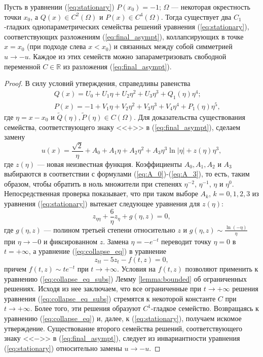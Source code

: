 \begin{proposition}
Пусть в уравнении (\ref{eq:stationary}) $P(x_0) = -1$; $\Omega$ --- некоторая окрестность точки $x_0$, а $Q(x) \in C^2(\Omega)$ и $P(x) \in C^4(\Omega)$.
Тогда существует два $C_1$-гладких однопараметрических семейства решений уравнения (\ref{eq:stationary}), соответствующих разложениям (\ref{eq:final_asympt}), коллапсирующих в точке $x = x_0$ (при подходе слева $x < x_0$) и связанных между собой симметрией $u \to -u$.
Каждое из этих семейств можно запараметризовать свободной переменной $C \in \mathbb{R}$ из разложения (\ref{eq:final_asympt}).
\label{prop:asymptotic}
\end{proposition}
%
\begin{proof}
В силу условий утверждения, справедливы равенства
%
\begin{eqnarray}
&& Q(x) = U_0 + U_1 \eta + U_2 \eta^2 + U_3 \eta^3 + Q_1(\eta)\eta^4; \\
&& P(x) = -1 + V_1 \eta+ V_2 \eta^2 + V_3 \eta^3 + V_4 \eta^4 + P_1(\eta)\eta^5,
\end{eqnarray}
%
где $\eta = x - x_0$ и $\widetilde{Q}(\eta), \widetilde{P}(\eta) \in C(\Omega)$.
Для доказательства существования семейства, соответствующего знаку <<$+$>> в (\ref{eq:final_asympt}), сделаем замену
%
\begin{equation}
u(x) = \frac{\sqrt{2}}\eta + A_0 + A_1 \eta + A_2 \eta^2 + A_3 \eta^3 \ln|\eta| + z(\eta)\eta^3,
\end{equation}
%
где $z(\eta)$ --- новая неизвестная функция.
Коэффициенты $A_0, A_1, A_2$ и $A_3$ выбираются в соответствии с формулами (\ref{eq:A_0})-(\ref{eq:A_3}), то есть, таким образом, чтобы обратить в ноль множители при степенях $\eta^{-2}$, $\eta^{-1}$, $\eta$ и $\eta^0$.
Непосредственная проверка показывает, что при таком выборе $A_k$, $k = 0,1,2,3$ из уравнения (\ref{eq:stationary}) вытекает следующее уравнения для $z(\eta)$:
%
\begin{equation}
z_{\eta\eta} + \frac{6}{\eta} z_\eta + g(\eta, z) = 0,
\label{eq:collapse_eq}
\end{equation}
%
где $g(\eta, z)$ --- полином третьей степени относительно $z$ и $g(\eta, z) \sim \frac{\ln(-\eta)}{\eta}$ при $\eta \to -0$ и фиксированном $z$.
Замена $\eta = -e^{-t}$ переводит точку $\eta = 0$ в $t = +\infty$, а уравнение (\ref{eq:collapse_eq}) в уравнение
%
\begin{equation}
z_{tt} - 5z_t - f(t,z) = 0,
\label{eq:collapse_eq_subs}
\end{equation}
%
причем $f(t,z) \sim te^{-t}$ при $t \to +\infty$.
Условия на $f(t,z)$ позволяют применить к уравнению (\ref{eq:collapse_eq_subs}) Лемму \ref{lemma:bounded} об ограниченных решениях.
Исходя из нее заключаем, что все ограниченные при $t \to +\infty$ решения уравнения (\ref{eq:collapse_eq_subs}) стремятся к некоторой константе $C$ при $t \to +\infty$.
Более того, эти решения образуют $C^1$-гладкое семейство.
Возвращаясь к уравнению (\ref{eq:collapse_eq}) и, далее, к (\ref{eq:stationary}), получаем искомое утверждение.
Существование второго семейства решений, соответствующего знаку <<$-$>> в (\ref{eq:final_asympt}), следует из инвариантности уравнения (\ref{eq:stationary}) относительно замены $u \to -u$.
\end{proof}

